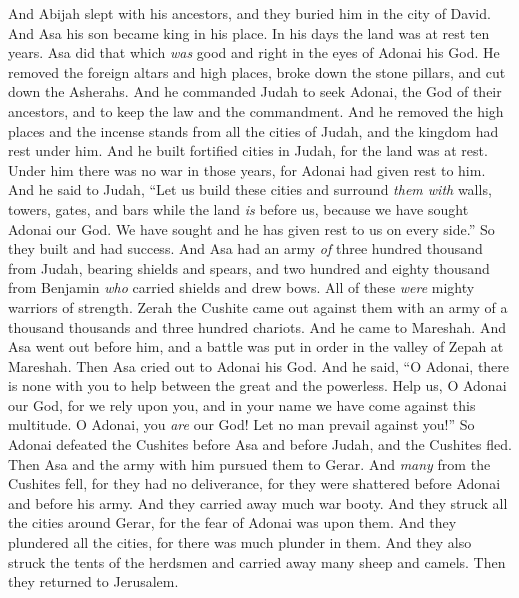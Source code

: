 \begin{biblechapter} %
  And Abijah slept with his ancestors, and they buried him in the city of David. And Asa his son became king in his place. In his days the land was at rest ten years.
\verse Asa did that which \textit{was} good and right in the eyes of Adonai his God.
\verse He removed the foreign altars and high places, broke down the stone pillars, and cut down the Asherahs.
\verse And he commanded Judah to seek Adonai, the God of their ancestors, and to keep the law and the commandment.
\verse And he removed the high places and the incense stands from all the cities of Judah, and the kingdom had rest under him.
\verse And he built fortified cities in Judah, for the land was at rest. Under him there was no war in those years, for Adonai had given rest to him.
\verse And he said to Judah, “Let us build these cities and surround \textit{them with} walls, towers, gates, and bars while the land \textit{is} before us, because we have sought Adonai our God. We have sought and he has given rest to us on every side.” So they built and had success.
\verse And Asa had an army \textit{of} three hundred thousand from Judah, bearing shields and spears, and two hundred and eighty thousand from Benjamin \textit{who} carried shields and drew bows. All of these \textit{were} mighty warriors of strength.
\verse Zerah the Cushite came out against them with an army of a thousand thousands and three hundred chariots. And he came to Mareshah.
\verse And Asa went out before him, and a battle was put in order in the valley of Zepah at Mareshah.
\verse Then Asa cried out to Adonai his God. And he said, “O Adonai, there is none with you to help between the great and the powerless. Help us, O Adonai our God, for we rely upon you, and in your name we have come against this multitude. O Adonai, you \textit{are} our God! Let no man prevail against you!”
\verse So Adonai defeated the Cushites before Asa and before Judah, and the Cushites fled.
\verse Then Asa and the army with him pursued them to Gerar. And \textit{many} from the Cushites fell, for they had no deliverance, for they were shattered before Adonai and before his army. And they carried away much war booty.
\verse And they struck all the cities around Gerar, for the fear of Adonai was upon them. And they plundered all the cities, for there was much plunder in them.
\verse And they also struck the tents of the herdsmen and carried away many sheep and camels. Then they returned to Jerusalem.
\end{biblechapter}

